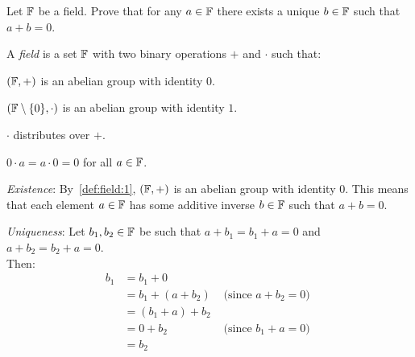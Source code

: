\begin{problem}
  Let $\mathbb{F}$ be a field.
  Prove that for any $a \in \mathbb{F}$ there exists a unique $b \in \mathbb{F}$
  such that $a + b = 0$.
\end{problem}

\begin{answer}
  \begin{definition}
    A \emph{field} is a set $\mathbb{F}$ with two binary operations $+$ and $\cdot$
    such that:
    \begin{enumarabic}
      \item $(\mathbb{F}, +)$ is an abelian group with identity $0$.~\label{def:field:1}
      \item $(\mathbb{F} \setminus \{0\}, \cdot)$ is an abelian group with identity $1$.
      \item $\cdot$ distributes over $+$.
      \item $0 \cdot a = a \cdot 0 = 0$ for all $a \in \mathbb{F}$.
    \end{enumarabic}
  \end{definition}

  \begin{enumroman}
    \item \emph{Existence}: By~\ref{def:field:1}, $(\mathbb{F}, +)$ is an abelian group
      with identity $0$.
      This means that each element $a \in \mathbb{F}$ has some additive inverse $b \in \mathbb{F}$
      such that $a + b = 0$.

    \item \emph{Uniqueness}: Let $b_1, b_2 \in \mathbb{F}$ be such that
      $a + b_1 = b_1 + a = 0$ and $a + b_2 = b_2 + a = 0$. \\
      Then:
      \begin{align*}
        b_1 &= b_1 + 0 \\
            &= b_1 + (a + b_2) &\text{ (since $a + b_2 = 0$) } \\
            &= (b_1 + a) + b_2\\
            &= 0 + b_2 &\text{ (since $b_1 + a = 0$)} \\
            &= b_2
      \end{align*}
  \end{enumroman}
\end{answer}
